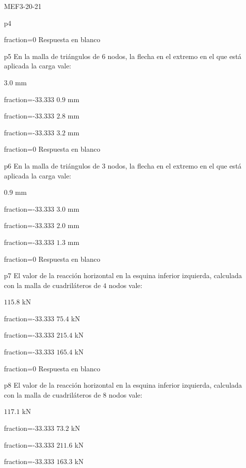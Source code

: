 \documentclass[a4paper]{article}
\begin{document}
\begin{quiz}{MEF3-20-21}
\begin{multi}{p4}
\item[fraction=0] Respuesta en blanco
\end{multi}
\begin{multi}{p5}
En la malla de tri\'angulos de $6$ nodos, la flecha en el extremo
en el que est\'a aplicada la carga vale:
\item* $3.0$ mm
\item[fraction=-33.333] $0.9$ mm
\item[fraction=-33.333] $2.8$ mm
\item[fraction=-33.333] $3.2$ mm
\item[fraction=0] Respuesta en blanco
\end{multi}
\begin{multi}{p6}
En la malla de tri\'angulos de $3$ nodos, la flecha en el extremo
en el que est\'a aplicada la carga vale:
\item* $0.9$ mm
\item[fraction=-33.333] $3.0$ mm
\item[fraction=-33.333] $2.0$ mm
\item[fraction=-33.333] $1.3$ mm
\item[fraction=0] Respuesta en blanco
\end{multi}
\begin{multi}{p7}
	El valor de la reacci\'on horizontal en la esquina inferior izquierda, calculada con
	la malla de cuadril\'ateros de $4$ nodos vale:
	\item* $115.8$ kN
	\item[fraction=-33.333]  $75.4$ kN
	\item[fraction=-33.333] $215.4$ kN
	\item[fraction=-33.333] $165.4$ kN
	\item[fraction=0] Respuesta en blanco
\end{multi}
\begin{multi}{p8}
	El valor de la reacci\'on horizontal en la esquina inferior izquierda, calculada con
	la malla de cuadril\'ateros de $8$ nodos vale:
	\item* $117.1$ kN
	\item[fraction=-33.333] $73.2$ kN
	\item[fraction=-33.333] $211.6$ kN
	\item[fraction=-33.333] $163.3$ kN

\end{multi}
\end{quiz}
\end{document}
